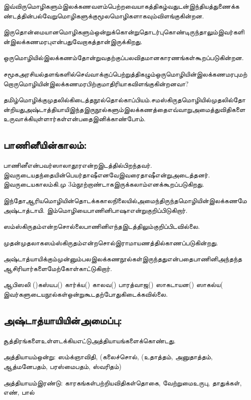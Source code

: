 இவ்விருமொழிகளும்இலக்கணவளம்பெற்றவையாகத்திகழ்வதுடன்இந்தியத்துணைக்கண்டத்தின்பல்வேறுமொழிகளுக்குமூலமொழிகளாகவும்விளங்குகின்றன. 

இருதொன்மையானமொழிகளும்ஒன்றுக்கொன்றுதொடர்புகொண்டிருந்தாலும்இவர்களின்இலக்கணமரபுஎன்பதுவேறாகத்தான்இருக்கிறது. 

ஒருமொழியில்இலக்கணம்தோன்றுவதற்குப்பலவிதமானகாரணங்கள்கூறப்படுகின்றன. 

சமூகஅரசியல்தளங்களில்செவ்வாக்குப்பெற்றுத்திகழும்ஒருமொழியின்இலக்கணமரபுமற்றொருமொழியின்இலக்கணமரபிற்குமாதிரியாகவிளங்குகின்றனவா? 

தமிழ்மொழிக்குமுதலில்கிடைத்தநூல்தொல்காப்பியம்.சமஸ்கிருதமொழியில்முதலில்தோன்றியதுஅஷ்டாத்தியாயிஇந்தஇருநூல்களும்இலக்கணத்தைஎவ்வாறுஅமைத்துவிதிகளைஉருவாக்கியுள்ளார்கள்என்பதைஇனிக்காண்போம்.

\subsection{பாணினீயின்காலம்:}

பாணினீஎன்பவர்ஸாலாதூரஎன்றஇடத்தில்பிறந்தவர். இவருடையதந்தையின்பெயர்தாஷீஎனவேஇவரைதாஷீஎன்றுஅடைத்தனர். இவருடையகாலம்கி.மு 3ம்நூற்றாண்டாகஇருக்கலாம்எனக்கூறப்படுகிறது.

 இந்தோஆரியமொழியின்தொடக்ககாலநிலையில்அமைந்திருந்தமொழியின்இலக்கணமேஅஷ்டாத்டாயி. இம்மொழியைபாணினிபாஷாஎன்றுகுறிப்பிடுகிறார். 

ஸம்ஸ்கிருதம்என்றசொல்லைபாணினிஎந்தஇடத்திலும்குறிப்பிடவில்லை. 

முதன்முதலாகஸம்ஸ்கிருதம்என்றசொல்இராமாயணத்தில்காணப்படுகின்றது. 

அஷ்டாத்யாயிக்கும்முன்னும்பலஇலக்கணநூல்கள்இருந்ததுஎன்பதைபாணினிஅந்தந்தஆசிரியார்களைமேற்கோள்காட்டுகிறார். 

ஆபிஸலி ()கஸ்யப() கார்க்ய() காலவ() பாரத்வாஜ() ஸாகடாயன() ஸாகல்ய( இவர்களுடையநூல்கள்ஒன்றுகூடதற்போதுகிடைக்கவில்லை.


\subsection{அஷ்டாத்யாயியின்அமைப்பு:}

 சூத்திரங்களைஉள்ளடக்கியஎட்டுஅத்தியாயங்களைக்கொண்டது.

\item அத்தியாயம்ஒன்று: ஸம்க்ஞாவிதி, (கலைச்சொல், (உதாத்தம், அனுதாத்தம், ஆத்மனேபதம், பரஸ்மைபதம், ஸ்வரிதம்)

 \item அத்தியாயம்இரண்டு: காரகங்கள்பற்றியவிதிகள்தொகை, வேற்றுமைஉருபு, தாதுக்கள், எண், பால்


